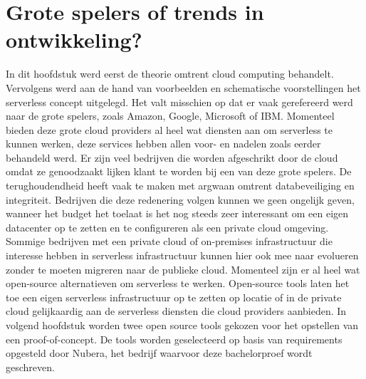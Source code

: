 \section{Grote spelers of trends in ontwikkeling?}
In dit hoofdstuk werd eerst de theorie omtrent cloud computing behandelt. Vervolgens werd aan de hand van voorbeelden en schematische voorstellingen het serverless concept uitgelegd. Het valt misschien op dat er vaak gerefereerd werd naar de grote spelers, zoals Amazon, Google, Microsoft of IBM. Momenteel bieden deze grote cloud providers al heel wat diensten aan om serverless te kunnen werken, deze services hebben allen voor- en nadelen zoals eerder behandeld werd. Er zijn veel bedrijven die worden afgeschrikt door de cloud omdat ze genoodzaakt lijken klant te worden bij een van deze grote spelers. De terughoudendheid heeft vaak te maken met argwaan omtrent databeveiliging en integriteit. Bedrijven die deze redenering volgen kunnen we geen ongelijk geven, wanneer het budget het toelaat is het nog steeds zeer interessant om een eigen datacenter op te zetten en te configureren als een private cloud omgeving. Sommige bedrijven met een private cloud of on-premises infrastructuur die interesse hebben in serverless infrastructuur kunnen hier ook mee naar evolueren zonder te moeten migreren naar de publieke cloud. Momenteel zijn er al heel wat open-source alternatieven om serverless te werken. Open-source tools laten het toe een eigen serverless infrastructuur op te zetten op locatie of in de private cloud gelijkaardig aan de serverless diensten die cloud providers aanbieden. In volgend hoofdstuk worden twee open source tools gekozen voor het opstellen van een proof-of-concept. De tools worden geselecteerd op basis van requirements opgesteld door Nubera, het bedrijf waarvoor deze bachelorproef wordt geschreven.

